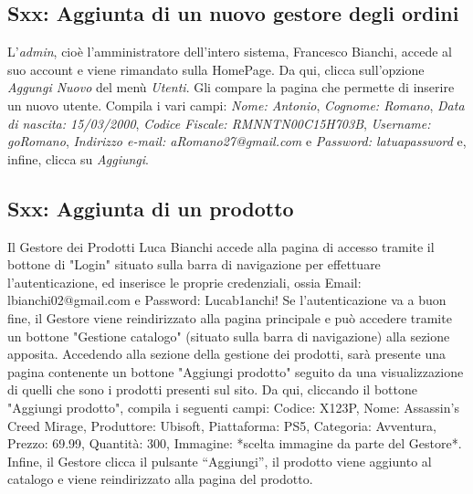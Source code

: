 \documentclass[12pt, a4paper, oneside]{book}
\begin{document}
    \subsection*{Sxx: Aggiunta di un nuovo gestore degli ordini}
    L'\textit{admin}, cioè l'amministratore dell'intero sistema, Francesco Bianchi, accede al suo account e viene rimandato sulla HomePage. Da qui, clicca sull'opzione \textit{Aggungi Nuovo} del menù \textit{Utenti}. Gli compare la pagina che permette di inserire un nuovo utente. Compila i vari campi: \textit{Nome: Antonio}, \textit{Cognome: Romano}, \textit{Data di nascita: 15/03/2000}, \textit{Codice Fiscale: RMNNTN00C15H703B}, \textit{Username: goRomano}, \textit{Indirizzo e-mail: aRomano27@gmail.com} e \textit{Password: latuapassword} e, infine, clicca su \textit{Aggiungi}.

    \subsection*{Sxx: Aggiunta di un prodotto}
    Il Gestore dei Prodotti Luca Bianchi accede alla pagina di accesso tramite il bottone di "Login" situato sulla barra di navigazione per effettuare l'autenticazione, ed inserisce le proprie credenziali, ossia Email: lbianchi02@gmail.com e Password: Lucab1anchi!
    Se l'autenticazione va a buon fine, il Gestore viene reindirizzato alla pagina principale e può accedere tramite un bottone "Gestione catalogo" (situato sulla barra di navigazione) alla sezione apposita.
    Accedendo alla sezione della gestione dei prodotti, sarà presente una pagina contenente un bottone "Aggiungi prodotto" seguito da una visualizzazione di quelli che sono i prodotti presenti sul sito.
    Da qui, cliccando il bottone "Aggiungi prodotto", compila i seguenti campi: Codice: X123P, Nome: Assassin's Creed Mirage, Produttore: Ubisoft, Piattaforma: PS5, Categoria: Avventura, Prezzo: 69.99, Quantità: 300, Immagine: *scelta immagine da parte del Gestore*.
    Infine, il Gestore clicca il pulsante “Aggiungi”, il prodotto viene aggiunto al catalogo e viene reindirizzato alla pagina del prodotto.
\end{document}
